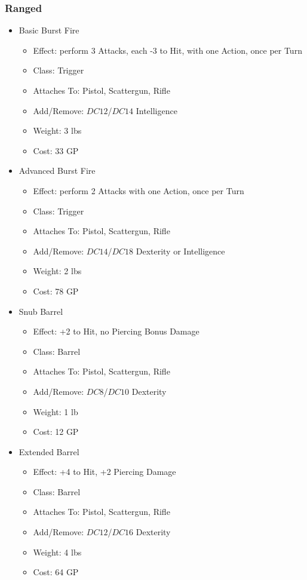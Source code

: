 \documentclass[12pt, twoside]{article}
\begin{document}
\begin{FlushLeft}
\begin{multicols}{2}
			\subsubsection{Ranged}
			\begin{itemize}[wide]
				\item Basic Burst Fire
				\begin{itemize}
					\item Effect: perform 3 Attacks, each -3 to Hit, with one Action, once per Turn
					\item Class: Trigger
					\item Attaches To: Pistol, Scattergun, Rifle
					\item Add/Remove: $DC12$/$DC14$ Intelligence
					\item Weight: 3 lbs
					\item Cost: 33 GP
				\end{itemize}
				\item Advanced Burst Fire
				\begin{itemize}
					\item Effect: perform 2 Attacks with one Action, once per Turn
					\item Class: Trigger
					\item Attaches To: Pistol, Scattergun, Rifle
					\item Add/Remove: $DC14$/$DC18$ Dexterity or Intelligence
					\item Weight: 2 lbs
					\item Cost: 78 GP
				\end{itemize}
				\item Snub Barrel
				\begin{itemize}
					\item Effect: +2 to Hit, no Piercing Bonus Damage  
					\item Class: Barrel
					\item Attaches To: Pistol, Scattergun, Rifle
					\item Add/Remove: $DC8$/$DC10$ Dexterity
					\item Weight: 1 lb
					\item Cost: 12 GP
				\end{itemize}
				\item Extended Barrel
				\begin{itemize}
					\item Effect: +4 to Hit, +2 Piercing Damage
					\item Class: Barrel
					\item Attaches To: Pistol, Scattergun, Rifle
					\item Add/Remove: $DC12$/$DC16$ Dexterity
					\item Weight: 4 lbs
					\item Cost: 64 GP
				\end{itemize}
			\end{itemize}
			\vfill \null \columnbreak


\end{multicols}
\end{FlushLeft}
\end{document}
